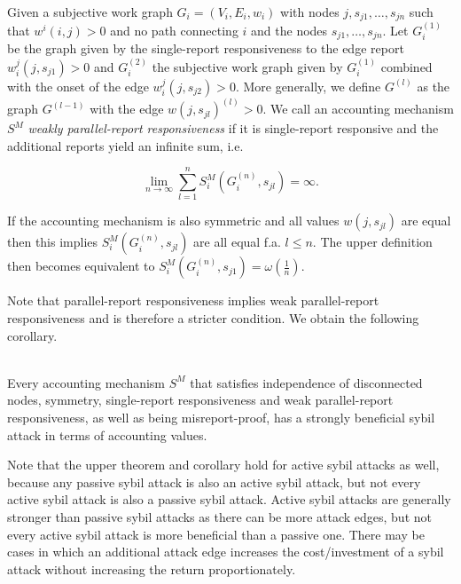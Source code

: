 \begin{definition}\ \\
\label{def:Weak Parallel-report responsiveness}
Given a subjective work graph $G_i=(V_i,E_i,w_i)$ with nodes $j,s_{j1},\ldots{},s_{jn}$ such that $w^i(i,j)>0$ and no path connecting $i$ and the nodes $s_{j1},\ldots{},s_{jn}$. Let $G_i^{(1)}$ be the graph given by the single-report responsiveness to the edge report $w^j_i(j,s_{j1})>0$ and $G_i^{(2)}$ the subjective work graph given by $G_i^{(1)}$ combined with the onset of the edge $w^j_i(j,s_{j2})>0$. More generally, we define $G^{(l)}$ as the graph $G^{(l-1)}$ with the edge $w(j,s_{jl})^{(l)}>0.$ We call an accounting mechanism $S^M$ {\it weakly parallel-report responsiveness} if it is single-report responsive and the additional reports yield an infinite sum, i.e.

\[
\lim\limits_{n\rightarrow\infty}\sum\limits_{l=1}^{n}S^M_i(G_i^{(n)},s_{jl})=\infty .
\] 

\noindent{}If the accounting mechanism is also symmetric and all values $w(j,s_{jl})$ are equal then this implies $S^M_i(G_i^{(n)},s_{jl})$ are all equal f.a. $l\leq{}n$. The upper definition then becomes equivalent to $S^M_i(G_i^{(n)},s_{j1}) = \omega(\frac{1}{n})$.
\end{definition}

\noindent{}Note that parallel-report responsiveness implies weak parallel-report responsiveness and is therefore a stricter condition. We obtain the following corollary. 

\begin{corollary}[]\ \\
\label{cor:Weak Parallel-report Responsiveness sybil attack}
Every accounting mechanism $S^M$ that satisfies independence of disconnected nodes, symmetry, single-report responsiveness and weak parallel-report responsiveness, as well as being misreport-proof, has a strongly beneficial sybil attack in terms of accounting values.
\end{corollary}

\noindent{}Note that the upper theorem and corollary hold for active sybil attacks as well, because any passive sybil attack is also an active sybil attack, but not every active sybil attack is also a passive sybil attack. Active sybil attacks are generally stronger than passive sybil attacks as there can be more attack edges, but not every active sybil attack is more beneficial than a passive one. There may be cases in which an additional attack edge increases the cost/investment of a sybil attack without increasing the return proportionately. \vspace{1em}\\

